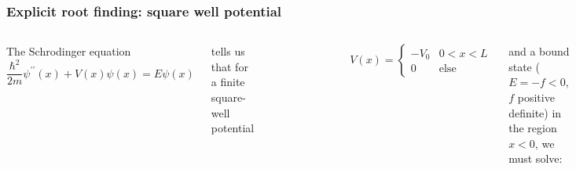 \documentclass[hyperref={colorlinks=true}]{beamer}
\begin{document}
\begin{frame}[shrink=20]
  \frametitle{Explicit root finding: square well potential}

  \begin{columns}
  
    
  The Schrodinger equation  
  \begin{equation}
    \frac{\hbar^2}{2m}\psi^{\prime\prime}(x) + V(x)\psi(x) = E\psi(x)
  \end{equation}
  
  \pause
  
  tells us that for a finite square-well potential
  
  \begin{figure}
    \includegraphics[width=0.6\columnwidth]{Finite_Square_Potential_Well.png}
  \end{figure}
  
  \vspace{-0.5cm}
  
  \begin{equation}
    V(x) = \begin{cases}  
             -V_0 & 0 < x < L \\
             0    & \mathrm{else}
           \end{cases}
  \end{equation}
  
  \pause
  
  and a bound state ($E=-f<0$, $f$ positive definite) in the region $x<0$, we must solve:
  
  \begin{equation}
    -\frac{\hbar^2}{2m}\psi^{\prime\prime}(x<0) = -f\psi(x<0)
  \end{equation}
    

  \pause
  The solution for $x<0$ is
  \begin{equation}
    \psi(x<0) = A e^{\sqrt{z_0^2 - z^2}\, x}, \mathrm{where} \, z_0^2 - z^2 = \frac{2mf}{\hbar^2}
  \end{equation}
  

\end{columns}
\end{frame}
\end{document}
